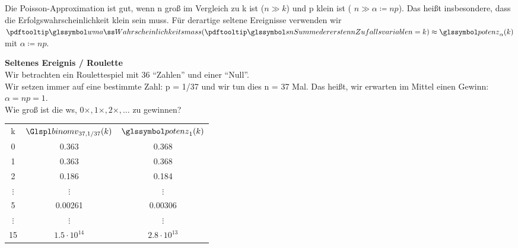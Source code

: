 \begin{bem}
    Die Poisson-Approximation ist gut, wenn n groß im Vergleich zu k ist ($n \gg k$) und p klein ist (
    $n \gg \alpha \coloneqq np$).
    Das heißt insbesondere, dass die Erfolgswahrscheinlichkeit klein sein muss.
    Für derartige seltene Ereignisse verwenden wir $\pe (\sn = k) \approx \potm_{\alpha}(k)$ mit $\alpha \coloneqq np$.
\end{bem}


\begin{bsp}
    \textbf{Seltenes Ereignis / Roulette}  \\
    Wir betrachten ein Roulettespiel mit 36 ``Zahlen'' und einer ``Null''. \\
    Wir setzen immer auf eine bestimmte Zahl: p = 1/37 und wir tun dies n = 37 Mal.
    Das heißt, wir erwarten im Mittel einen Gewinn:$\alpha  = np = 1$. \\
    Wie groß ist die \gls{ws}, $ 0 \times, 1 \times, 2 \times, \dots$ zu gewinnen?
    \begin{mytable}
        \begin{tabular}{ccc}
            k & $\Bnmv_{37,1/37}(k)$ & $\potm_1(k)$ \\
            0 & 0.363 & 0.368 \\
            1 & 0.363 & 0.368 \\
            2 & 0.186 &  0.184 \\
            $\vdots$ & $\vdots$ & $\vdots$ \\
            5&  0.00261 & 0.00306 \\
            $\vdots$ & $\vdots$ & $\vdots$ \\
            15  & $1.5 \cdot 10^{14} $ & $2.8 \cdot 10^{13}$
        \end{tabular} %
    \end{mytable}
\end{bsp}

